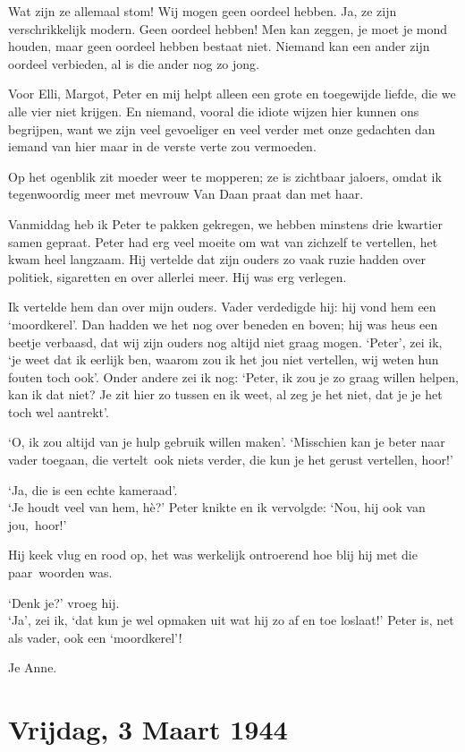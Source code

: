 \documentclass{book}
\begin{document}
Wat zijn ze allemaal stom! Wij mogen geen oordeel hebben. Ja, ze zijn
verschrikkelijk modern. Geen oordeel hebben! Men kan zeggen, je moet je
mond houden, maar geen oordeel hebben bestaat niet. Niemand kan een
ander zijn oordeel verbieden, al is die ander nog zo jong.

Voor Elli, Margot, Peter en mij helpt alleen een grote en toegewijde
liefde, die we alle vier niet krijgen. En niemand, vooral die idiote
wijzen hier kunnen ons begrijpen, want we zijn veel gevoeliger en veel
verder met onze gedachten dan iemand van hier maar in de verste verte
zou vermoeden.

Op het ogenblik zit moeder weer te mopperen; ze is zichtbaar jaloers,
omdat ik tegenwoordig meer met mevrouw Van Daan praat dan met haar.

Vanmiddag heb ik Peter te pakken gekregen, we hebben minstens drie
kwartier samen gepraat. Peter had erg veel moeite om wat van zichzelf te
vertellen, het kwam heel langzaam. Hij vertelde dat zijn ouders zo vaak
ruzie hadden over politiek, sigaretten en over allerlei meer. Hij was
erg verlegen.

Ik vertelde hem dan over mijn ouders. Vader verdedigde hij: hij vond hem
een `moordkerel'. Dan hadden we het nog over beneden en boven; hij was
heus een beetje verbaasd, dat wij zijn ouders nog altijd niet graag
mogen. `Peter', zei ik, `je weet dat ik eerlijk ben, waarom zou ik het
jou niet vertellen, wij weten hun fouten toch ook'. Onder andere zei ik
nog: `Peter, ik zou je zo graag willen helpen, kan ik dat niet? Je zit
hier zo tussen en ik weet, al zeg je het niet, dat je je het toch wel
aantrekt'.

`O, ik zou altijd van je hulp gebruik willen maken'. `Misschien kan je
beter naar vader toegaan, die vertelt~ook niets verder, die kun je het
gerust vertellen, hoor!'

`Ja, die is een echte kameraad'.\\`Je houdt veel van hem, hè?' Peter
knikte en ik vervolgde: `Nou, hij ook van jou,~hoor!'

Hij keek vlug en rood op, het was werkelijk ontroerend hoe blij hij met
die paar~woorden was.

`Denk je?' vroeg hij.\\`Ja', zei ik, `dat kun je wel opmaken uit wat hij
zo af en toe loslaat!' Peter is, net als vader, ook een `moordkerel'!

Je Anne.

\chapter{Vrijdag, 3 Maart 1944}
\end{document}
